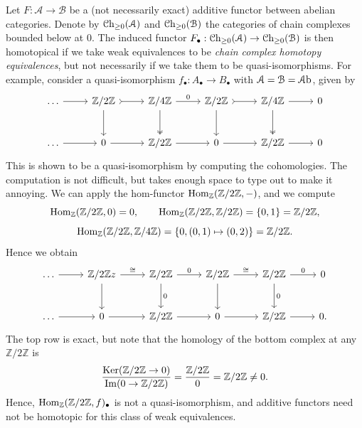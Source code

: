 \begin{example}
	Let $F : \mathcal{A}  \to \mathcal{B} $ be a (not necessarily exact) additive functor between abelian categories. Denote by $\mathcal{C}\mathrm{h}_{\geq 0} (\mathcal{A} )$ and $\mathcal{C}\mathrm{h}_{\geq 0} (\mathcal{B} )$ the categories of chain complexes bounded below at $0$. The induced functor $F_{\bullet} : \mathcal{C}\mathrm{h}_{\geq 0} (\mathcal{A} ) \to \mathcal{C}\mathrm{h}_{\geq 0} (\mathcal{B} )$ is then homotopical if we take weak equivalences to be \emph{chain complex homotopy equivalences}, but not necessarily if we take them to be quasi-isomorphisms. For example, consider a quasi-isomorphism $f_{\bullet} : A_{\bullet}  \to B_{\bullet} $ with $\mathcal{A} =\mathcal{B} =\mathcal{A}\mathrm{b}$, given by
	\[\begin{tikzcd}[row sep = 2.5em, column sep = 2.5em]
	\ldots \ar[r]  & \mathbb{Z} /2\mathbb{Z} \ar[d] \ar[tail, r]  & \mathbb{Z} /4\mathbb{Z}  \ar[two heads, d] \ar[" 0 ", r]  & \mathbb{Z} /2\mathbb{Z} \ar[tail, r] \ar[d]  & \mathbb{Z} /4\mathbb{Z} \ar[r] \ar[two heads, d]  & 0 \\
	\ldots \ar[r]  & 0\ar[r]  & \mathbb{Z} /2\mathbb{Z} \ar[r]  & 0\ar[r]  & \mathbb{Z} /2\mathbb{Z} \ar[r]  & 0
	\end{tikzcd}\]
	This is shown to be a quasi-isomorphism by computing the cohomologies. The computation is not difficult, but takes enough space to type out to make it annoying. We can apply the hom-functor $\operatorname{Hom}_{\mathbb{Z} }(\mathbb{Z} /2\mathbb{Z} , -) $, and we compute
	\[
		\operatorname{Hom}_{\mathbb{Z} }(\mathbb{Z} /2\mathbb{Z} , 0) =0,\qquad \operatorname{Hom}_{\mathbb{Z} }(\mathbb{Z} /2\mathbb{Z} , \mathbb{Z} /2\mathbb{Z} ) =\left\{ 0,1 \right\} =\mathbb{Z} /2\mathbb{Z} 
	,\]
	\[
		\operatorname{Hom}_{\mathbb{Z} }(\mathbb{Z} /2\mathbb{Z} , \mathbb{Z} /4\mathbb{Z} ) =\left\{ 0,(0,1)\mapsto (0,2) \right\} =\mathbb{Z} /2\mathbb{Z} 
	.\]
	Hence we obtain
	\[\begin{tikzcd}[row sep = 2.5em, column sep = 2.5em]
		\ldots \ar[r]  & \mathbb{Z} /2\mathbb{Z} z\ar[" \cong ", r] \ar[d]  & \mathbb{Z} /2\mathbb{Z} \ar[" 0 ", r] \ar[" 0 ", d]  & \mathbb{Z}/2\mathbb{Z} \ar[" \cong ", r] \ar[d]  & \mathbb{Z} /2\mathbb{Z} \ar[" 0 ", r] \ar[" 0 ", d]  & 0 \\
	\ldots \ar[r]  & 0\ar[r]  & \mathbb{Z} /2\mathbb{Z} \ar[r]  & 0\ar[r]  & \mathbb{Z} /2\mathbb{Z} \ar[r]  & 0.
	\end{tikzcd}\]
	The top row is exact, but note that the homology of the bottom complex at any $\mathbb{Z} /2\mathbb{Z} $ is
	\[
		\frac{\operatorname{Ker} (\mathbb{Z} /2\mathbb{Z} \to 0)}{\operatorname{Im}(0\to \mathbb{Z} /2\mathbb{Z} )} =\frac{\mathbb{Z} /2\mathbb{Z} }{0} =\mathbb{Z} /2\mathbb{Z} \neq 0
	.\]
	Hence, $\operatorname{Hom}_{\mathbb{Z} }(\mathbb{Z} /2\mathbb{Z} , f) _{\bullet} $ is not a quasi-isomorphism, and additive functors need not be homotopic for this class of weak equivalences.
\end{example}


